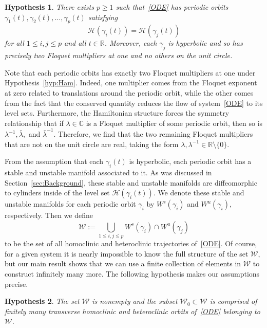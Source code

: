\documentclass[11pt]{article}
\newcommand{\R}{\mathbb{R}}
\newcommand{\W}{\mathcal{W}}
\numberwithin{equation}{section}
\theoremstyle{plain}
\newtheorem{hyp}{Hypothesis}
\begin{document}
\begin{hyp}\label{hyp:Periodic} %
There exists $p \geq 1$ such that~\eqref{ODE} has periodic orbits $\gamma_1(t), \gamma_2(t), \dots, \gamma_p(t)$ satisfying 
\begin{equation}
	\mathcal{H}(\gamma_i(t)) = \mathcal{H}(\gamma_j(t))
\end{equation}
for all $1 \leq i,j \leq p$ and all $t \in \R$. Moreover, each $\gamma_j$ is hyperbolic and so has precisely two Floquet multipliers at one and no others on the unit circle.
\end{hyp}

Note that each periodic orbits has exactly two Floquet multipliers at one under Hypothesis~\ref{hyp:Ham}. Indeed, one multiplier comes from the Floquet exponent at zero related to translations around the periodic orbit, while the other comes from the fact that the conserved quantity reduces the flow of system~\eqref{ODE} to its level sets. Furthermore, the Hamiltonian structure forces the symmetry relationship that if $\lambda \in \mathbb{C}$ is a Floquet multiplier of some periodic orbit, then so is $\lambda^{-1},\bar \lambda,$ and $\bar \lambda^{-1}$. Therefore, we find that the two remaining Floquet multipliers that are not on the unit circle are real, taking the form $\lambda,\lambda^{-1} \in \mathbb{R}\setminus\{0\}$.  

From the assumption that each $\gamma_i(t)$ is hyperbolic, each periodic orbit has a stable and unstable manifold associated to it. As was discussed in Section~\ref{sec:Background}, these stable and unstable manifolds are diffeomorphic to cylinders inside of the level set $\mathcal{H}(\gamma_i(t))$. We denote these stable and unstable manifolds for each periodic orbit $\gamma_i$ by $W^s(\gamma_i)$ and $W^u(\gamma_i)$, respectively. Then we define 
\begin{equation}
	\W := \bigcup_{1 \leq i,j\leq p} W^s(\gamma_i) \cap W^u(\gamma_j)
\end{equation}
to be the set of all homoclinic and heteroclinic trajectories of~\eqref{ODE}. Of course, for a given system it is nearly impossible to know the full structure of the set $\W$, but our main result shows that we can use a finite collection of elements in $\W$ to construct infinitely many more. The following hypothesis makes our assumptions precise.

\begin{hyp}\label{hyp:HomHet} %
The set $\W$ is nonempty and the subset $\W_0 \subset \W$ is comprised of finitely many transverse homoclinic and heteroclinic orbits of~\eqref{ODE} belonging to $\W$.
\end{hyp}
\end{document}
